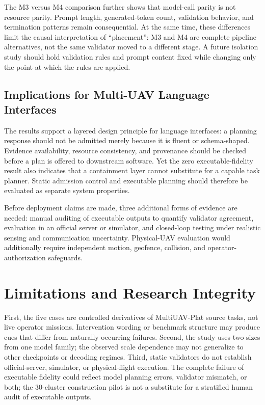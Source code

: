\documentclass{article}
\newcommand{\Mthree}{\textsc{M3}\xspace}
\newcommand{\Mfour}{\textsc{M4}\xspace}
\begin{document}
The \Mthree{} versus \Mfour comparison further shows that model-call parity is
not resource parity. Prompt length, generated-token count, validation behavior,
and termination patterns remain consequential. At the same time, these
differences limit the causal interpretation of ``placement'': \Mthree and
\Mfour are complete pipeline alternatives, not the same validator moved to a
different stage. A future isolation study should hold validation rules and
prompt content fixed while changing only the point at which the rules are
applied.

\subsection{Implications for Multi-UAV Language Interfaces}

The results support a layered design principle for language interfaces: a
planning response should not be admitted merely because it is fluent or
schema-shaped. Evidence availability, resource consistency, and provenance
should be checked before a plan is offered to downstream software. Yet the
zero executable-fidelity result also indicates that a containment layer cannot
substitute for a capable task planner. Static admission control and executable
planning should therefore be evaluated as separate system properties.

Before deployment claims are made, three additional forms of evidence are
needed: manual auditing of executable outputs to quantify validator agreement,
evaluation in an official server or simulator, and closed-loop testing under
realistic sensing and communication uncertainty. Physical-UAV evaluation
would additionally require independent motion, geofence, collision, and
operator-authorization safeguards.

\section{Limitations and Research Integrity}

First, the five cases are controlled derivatives of MultiUAV-Plat source tasks,
not live operator missions. Intervention wording or benchmark structure may
produce cues that differ from naturally occurring failures. Second, the study
uses two sizes from one model family; the observed scale dependence may not
generalize to other checkpoints or decoding regimes. Third, static validators
do not establish official-server, simulator, or physical-flight execution.
The complete failure of executable fidelity could reflect model planning
errors, validator mismatch, or both; the 30-cluster construction pilot is not a
substitute for a stratified human audit of executable outputs.
\end{document}
